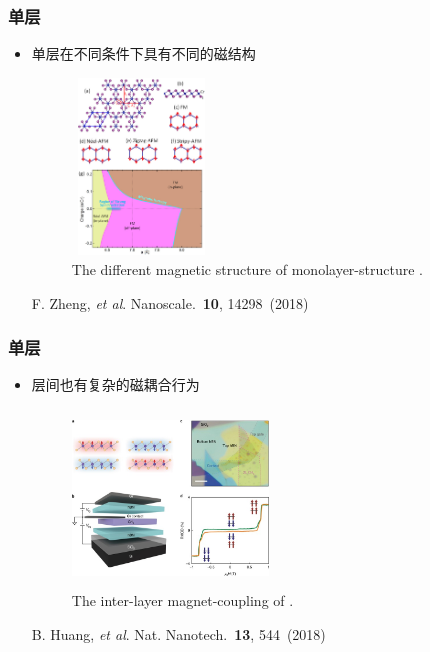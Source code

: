 \documentclass[cjk,slidestop,compress,mathserif,blue]{beamer}
\begin{document}
\frame
{
	\frametitle{单层\textrm{}}
	\begin{itemize}
		\item 单层\textrm{}在不同条件下具有不同的磁结构
\begin{figure}[h!]
\vspace*{-0.08in}
\centering
\includegraphics[height=1.85in,width=1.45in]{Figures/CrI3-magnet-struct-1.png}
\caption{\tiny \textrm{The different magnetic structure of monolayer-structure .}}%
\label{Fig:Mono-layere-CrI3}
\end{figure}
\textrm{F. Zheng, \textit{et al}.  Nanoscale. \textbf{10}, 14298~(2018)}
	\end{itemize}
}

\frame
{
	\frametitle{单层\textrm{}}
	\begin{itemize}
		\item \textrm{}层间也有复杂的磁耦合行为
\begin{figure}[h!]
\vspace*{-0.08in}
\centering
\includegraphics[height=1.85in,width=2.05in]{Figures/CrI3-magnet-struct-2.png}
\caption{\tiny \textrm{The inter-layer magnet-coupling of .}}%
\label{Fig:Inter-layer-CrI3}
\end{figure}
\textrm{B. Huang, \textit{et al}.  Nat. Nanotech. \textbf{13}, 544~(2018)}
	\end{itemize}
}
\end{document}
